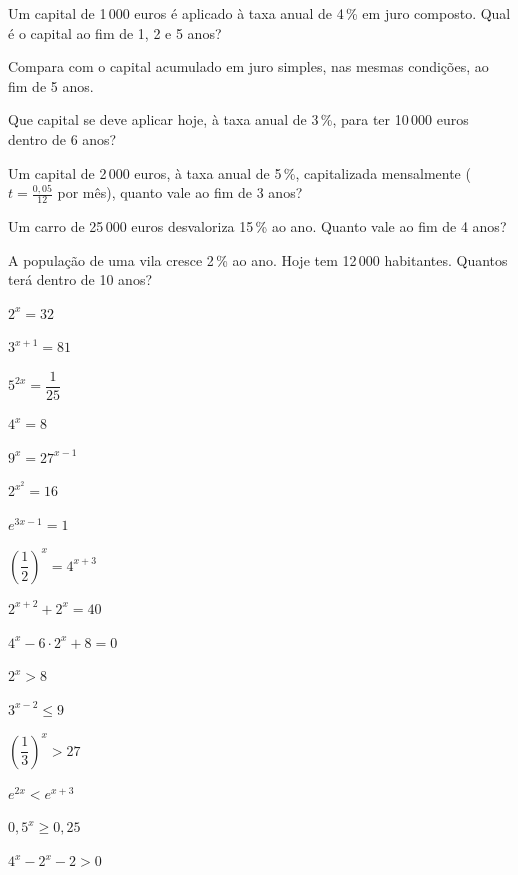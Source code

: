 \documentclass[12pt]{article}
\begin{document}


\begin{exercicios}
  \item Um capital de 1\,000 euros é aplicado à taxa anual de 4\,\% em juro composto. Qual é o capital ao fim de 1, 2 e 5 anos?
  \item Compara com o capital acumulado em juro simples, nas mesmas condições, ao fim de 5 anos.
  \item Que capital se deve aplicar hoje, à taxa anual de 3\,\%, para ter 10\,000 euros dentro de 6 anos?
  \item Um capital de 2\,000 euros, à taxa anual de 5\,\%, capitalizada mensalmente ($t = \frac{0{,}05}{12}$ por mês), quanto vale ao fim de 3 anos?
  \item Um carro de 25\,000 euros desvaloriza 15\,\% ao ano. Quanto vale ao fim de 4 anos?
  \item A população de uma vila cresce 2\,\% ao ano. Hoje tem 12\,000 habitantes. Quantos terá dentro de 10 anos?
\end{exercicios}

\begin{exercicios}
  \item $2^x = 32$
  \item $3^{x+1} = 81$
  \item $5^{2x} = \dfrac{1}{25}$
  \item $4^x = 8$
  \item $9^{x} = 27^{x - 1}$
  \item $2^{x^2} = 16$
  \item $e^{3x - 1} = 1$
  \item $\left(\dfrac{1}{2}\right)^x = 4^{x+3}$
  \item $2^{x+2} + 2^x = 40$
  \item $4^x - 6 \cdot 2^x + 8 = 0$
\end{exercicios}

\begin{exercicios}
  \item $2^x > 8$
  \item $3^{x - 2} \le 9$
  \item $\left(\dfrac{1}{3}\right)^x > 27$
  \item $e^{2x} < e^{x + 3}$
  \item $0{,}5^{x} \ge 0{,}25$
  \item $4^x - 2^x - 2 > 0$
\end{exercicios}
\end{document}
